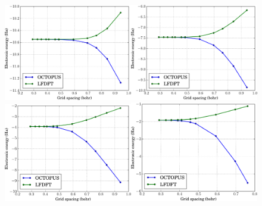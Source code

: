 \documentclass{article}
\begin{document}
\thispagestyle{empty}

\begin{figure}
\includegraphics[width=0.5\textwidth]{A_10_alpha_0_5.pdf}\includegraphics[width=0.5\textwidth]{A_10_alpha_1.pdf}
\includegraphics[width=0.5\textwidth]{A_10_alpha_2.pdf}\includegraphics[width=0.5\textwidth]{A_10_alpha_3.pdf}
\end{figure}
\end{document}
